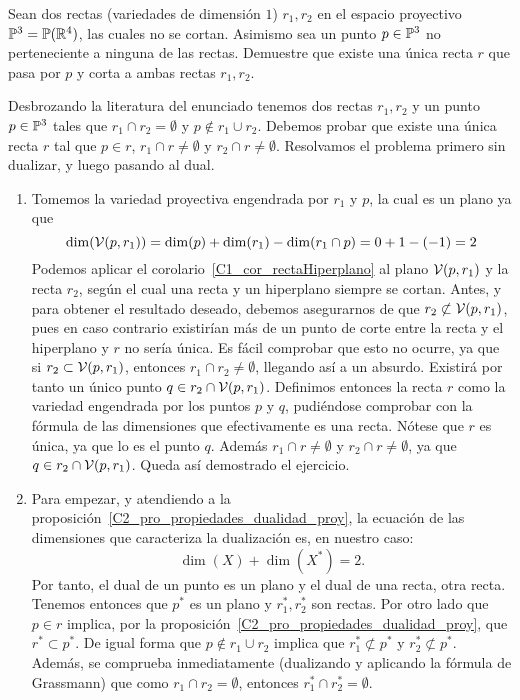 \begin{exa}
	Sean dos rectas (variedades de dimensión $1$) $r_1,r_2$ en el espacio proyectivo $\mathbb{P}^3=\mathbb{P}(\mathbb{R}^4)$, las cuales no se cortan. Asimismo sea un punto $p\in\mathbb{P}^3$ no perteneciente a ninguna de las rectas. Demuestre que existe una única recta $r$ que pasa por $p$ y corta a ambas rectas $r_1, r_2$.
	
	Desbrozando la literatura del enunciado tenemos dos rectas $r_1,r_2$ y un punto $p\in\mathbb{P}^3$ tales que $r_1\cap r_2=\emptyset$ y $p\not\in r_1\cup r_2$. Debemos probar que existe una única recta $r$ tal que $p\in r$, $r_1\cap r\not=\emptyset$ y $r_2\cap r\not=\emptyset$. Resolvamos el problema primero sin dualizar, y luego pasando al dual.
	\begin{enumerate}
		\item Tomemos la variedad proyectiva engendrada por $r_1$ y $p$, la cual es un plano ya que
		\begin{equation*}
		\dim(\mathcal{V}(p,r_1))=\dim(p)+\dim(r_1)-\dim(r_1\cap p)=0+1-(-1)=2
		\end{equation*}
		Podemos aplicar el corolario~\ref{C1_cor_rectaHiperplano} al plano $\mathcal{V}(p,r_1)$ y la recta $r_2$, según el cual una recta y un hiperplano siempre se cortan. Antes, y para obtener el resultado deseado, debemos asegurarnos de que $r_2\not\subset\mathcal{V}(p,r_1)$, pues en caso contrario existirían más de un punto de corte entre la recta y el hiperplano y $r$ no sería única. Es fácil comprobar que esto no ocurre, ya que si $r_2\subset\mathcal{V}(p,r_1)$, entonces $r_1\cap r_2\not=\emptyset$, llegando así a un absurdo. Existirá por tanto un único punto $q\in r_2\cap\mathcal{V}(p,r_1)$. Definimos entonces la recta $r$ como la variedad engendrada por los puntos $p$ y $q$, pudiéndose comprobar con la fórmula de las dimensiones que efectivamente es una recta. Nótese que $r$ es única, ya que lo es el punto $q$. Además $r_1\cap r\not=\emptyset$ y $r_2\cap r\not=\emptyset$, ya que $q\in r_2\cap\mathcal{V}(p,r_1)$. Queda así demostrado el ejercicio.
		
		\item Para empezar, y atendiendo a la proposición~\ref{C2_pro_propiedades_dualidad_proy}, la ecuación de las dimensiones que caracteriza la dualización es, en nuestro caso:
		\begin{equation*}
		\dim(X)+\dim(X^*)=2. 
		\end{equation*}
		Por tanto, el dual de un punto es un plano y el dual de una recta, otra recta. Tenemos entonces que $p^*$ es un plano y $r_1^*,r_2^*$ son rectas. Por otro lado que $p\in r$ implica, por la proposición~\ref{C2_pro_propiedades_dualidad_proy}, que $r^*\subset p^*$. De igual forma que $p\not\in r_1\cup r_2$ implica que $r_1^*\not\subset p^*$ y $r_2^*\not\subset p^*$. Además, se comprueba inmediatamente (dualizando y aplicando la fórmula de Grassmann) que como $r_1\cap r_2=\emptyset$, entonces $r_1^*\cap r_2^*=\emptyset$.
		

\end{enumerate}
\end{exa}
